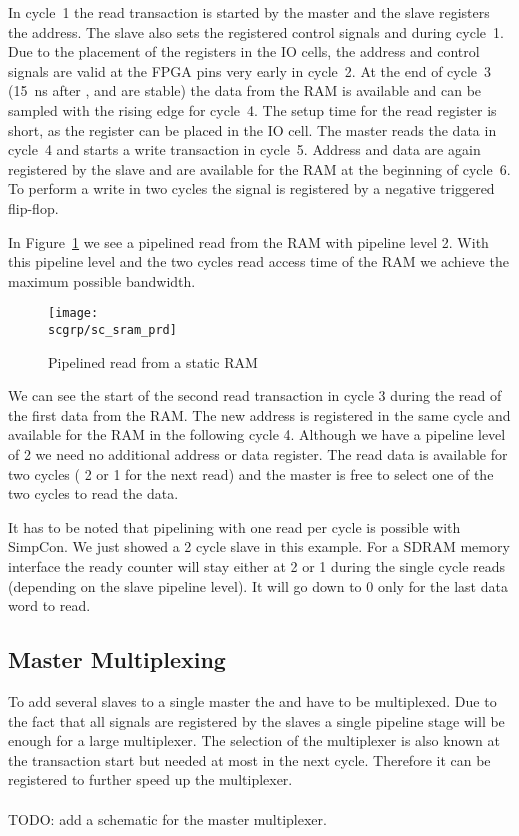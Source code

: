 In cycle~1 the read transaction is started by the master and the
slave registers the address. The slave also sets the registered
control signals  and  during cycle~1. Due to the
placement of the registers in the IO cells, the address and control
signals are valid at the FPGA pins very early in cycle~2. At the end
of cycle~3 (15~ns after ,  and  are
stable) the data from the RAM is available and can be sampled with
the rising edge for cycle~4. The setup time for the read register is
short, as the register can be placed in the IO cell. The master reads
the data in cycle~4 and starts a write transaction in cycle~5.
Address and data are again registered by the slave and are available
for the RAM at the beginning of cycle~6. To perform a write in two
cycles the  signal is registered by a negative triggered
flip-flop.

In Figure~\ref{fig:sc:sram:prd} we see a pipelined read from the RAM
with pipeline level 2. With this pipeline level and the two cycles
read access time of the RAM we achieve the maximum possible
bandwidth.

\begin{figure}
    \centering
    \texttt{[image: \\scgrp/sc\_sram\_prd]}
    \caption{Pipelined read from a static RAM}
    \label{fig:sc:sram:prd}
\end{figure}

We can see the start of the second read transaction in cycle 3
during the read of the first data from the RAM. The new address is
registered in the same cycle and available for the RAM in the
following cycle 4. Although we have a pipeline level of 2 we need no
additional address or data register. The read data is available for
two cycles ( 2 or 1 for the next read) and the master
is free to select one of the two cycles to read the data.

It has to be noted that pipelining with one read per cycle is
possible with SimpCon. We just showed a 2 cycle slave in this
example. For a SDRAM memory interface the ready counter will stay
either at 2 or 1 during the single cycle reads (depending on the
slave pipeline level). It will go down to 0 only for the last data
word to read.

\subsection{Master Multiplexing}

To add several slaves to a single master the  and
 have to be multiplexed. Due to the fact that all
 signals are registered by the slaves a single
pipeline stage will be enough for a large multiplexer. The selection
of the multiplexer is also known at the transaction start but needed
at most in the next cycle. Therefore it can be registered to further
speed up the multiplexer.
\ \\
\ \\
TODO: add a schematic for the master  multiplexer.

